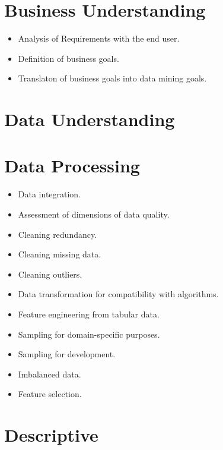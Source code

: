 \documentclass[a4paper,12pt]{report}
\begin{document}
\chapter{Business Understanding}

\begin{itemize}
    \item Analysis of Requirements with the end user.
    \item Definition of business goals.
    \item Translaton of business goals into data mining goals.
\end{itemize}




\chapter{Data Understanding}



\chapter{Data Processing}

\begin{itemize}
    \item Data integration.
    \item Assessment of dimensions of data quality.
    \item Cleaning redundancy.
    \item Cleaning missing data.
    \item Cleaning outliers.
    \item Data transformation for compatibility with algorithms.
    \item Feature engineering from tabular data.
    \item Sampling for domain-specific purposes.
    \item Sampling for development.
    \item Imbalanced data.
    \item Feature selection.
\end{itemize}


\chapter{Descriptive}
\end{document}

